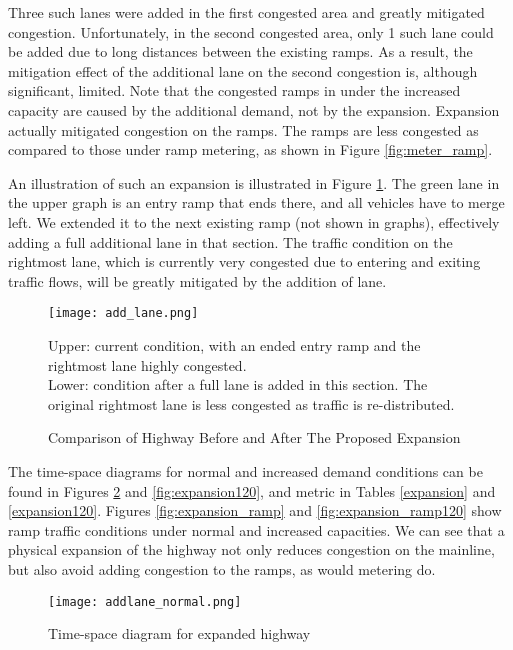 \documentclass{article}
\begin{document}
Three such lanes were added in the first congested area and greatly mitigated congestion. Unfortunately, in the second congested area, only 1 such lane could be added due to long distances between the existing ramps. As a result, the mitigation effect of the additional lane on the second congestion is, although significant, limited. Note that the congested ramps in under the increased capacity are caused by the additional demand, not by the expansion. Expansion actually mitigated congestion on the ramps. The ramps are less congested as compared to those under ramp metering, as shown in Figure \ref{fig:meter_ramp}.

An illustration of such an expansion is illustrated in Figure \ref{fig:expand}. The green lane in the upper graph is an entry ramp that ends there, and all vehicles have to merge left. We extended it to the next existing ramp (not shown in graphs), effectively adding a full additional lane in that section. The traffic condition on the rightmost lane, which is currently very congested due to entering and exiting traffic flows, will be greatly mitigated by the addition of lane.

\begin{figure}
    \centering
    \texttt{[image: add\_lane.png]}
    \caption{Comparison of Highway Before and After The Proposed Expansion}
    Upper: current condition, with an ended entry ramp and the rightmost lane highly congested. \\
    Lower: condition after a full lane is added in this section. The original rightmost lane is less congested as traffic is re-distributed.
    \label{fig:expand}
\end{figure}

The time-space diagrams for normal and increased demand conditions can be found in Figures \ref{fig:expansion} and \ref{fig:expansion120}, and metric in Tables \ref{expansion} and \ref{expansion120}. Figures \ref{fig:expansion_ramp} and \ref{fig:expansion_ramp120} show ramp traffic conditions under normal and increased capacities. We can see that a physical expansion of the highway not only reduces congestion on the mainline, but also avoid adding congestion to the ramps, as would metering do.

\begin{figure}
    \centering
    \texttt{[image: addlane\_normal.png]}
    \caption{Time-space diagram for expanded highway}
    \label{fig:expansion}
\end{figure}
\end{document}

